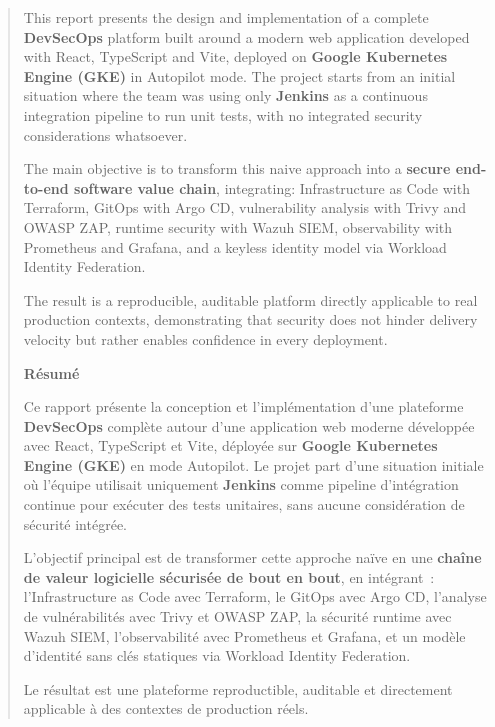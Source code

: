 \begin{abstract}

This report presents the design and implementation of a complete \textbf{DevSecOps} platform
built around a modern web application developed with React, TypeScript and Vite, deployed on
\textbf{Google Kubernetes Engine (GKE)} in Autopilot mode. The project starts from an initial
situation where the team was using only \textbf{Jenkins} as a continuous integration pipeline
to run unit tests, with no integrated security considerations whatsoever.

The main objective is to transform this naive approach into a \textbf{secure end-to-end software
value chain}, integrating: Infrastructure as Code with Terraform, GitOps with Argo CD,
vulnerability analysis with Trivy and OWASP ZAP, runtime security with Wazuh SIEM, observability
with Prometheus and Grafana, and a keyless identity model via Workload Identity Federation.

The result is a reproducible, auditable platform directly applicable to real production contexts,
demonstrating that security does not hinder delivery velocity but rather enables confidence
in every deployment.

\vspace{0.5cm}

\vspace{1.5cm}
\centerline{\large\bf Résumé}
\vspace{0.6cm}

Ce rapport présente la conception et l'implémentation d'une plateforme \textbf{DevSecOps} complète
autour d'une application web moderne développée avec React, TypeScript et Vite, déployée sur
\textbf{Google Kubernetes Engine (GKE)} en mode Autopilot. Le projet part d'une situation initiale
où l'équipe utilisait uniquement \textbf{Jenkins} comme pipeline d'intégration continue pour
exécuter des tests unitaires, sans aucune considération de sécurité intégrée.

L'objectif principal est de transformer cette approche naïve en une \textbf{chaîne de valeur
logicielle sécurisée de bout en bout}, en intégrant~: l'Infrastructure as Code avec Terraform,
le GitOps avec Argo CD, l'analyse de vulnérabilités avec Trivy et OWASP ZAP, la sécurité runtime
avec Wazuh SIEM, l'observabilité avec Prometheus et Grafana, et un modèle d'identité sans clés
statiques via Workload Identity Federation.

Le résultat est une plateforme reproductible, auditable et directement applicable à des contextes
de production réels.

\vspace{0.5cm}

\end{abstract}
